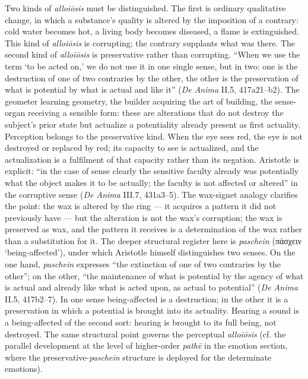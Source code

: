 \documentclass{article}
\newcommand{\gk}[1]{{\greekfont #1}}
\begin{document}
Two kinds of \textit{alloiōsis} must be distinguished. The first is ordinary qualitative change, in which a substance's quality is altered by the imposition of a contrary: cold water becomes hot, a living body becomes diseased, a flame is extinguished. This kind of \textit{alloiōsis} is corrupting; the contrary supplants what was there. The second kind of \textit{alloiōsis} is preservative rather than corrupting. ``When we use the term `to be acted on,' we do not use it in one single sense, but in two: one is the destruction of one of two contraries by the other, the other is the preservation of what is potential by what is actual and like it'' (\textit{De Anima} II.5, 417a21--b2). The geometer learning geometry, the builder acquiring the art of building, the sense-organ receiving a sensible form: these are alterations that do not destroy the subject's prior state but actualize a potentiality already present as first actuality. Perception belongs to the preservative kind. When the eye sees red, the eye is not destroyed or replaced by red; its capacity to see is actualized, and the actualization is a fulfilment of that capacity rather than its negation. Aristotle is explicit: ``in the case of sense clearly the sensitive faculty already was potentially what the object makes it to be actually; the faculty is not affected or altered'' in the corruptive sense (\textit{De Anima} III.7, 431a3--5). The wax-signet analogy clarifies the point: the wax is altered by the ring --- it acquires a pattern it did not previously have --- but the alteration is not the wax's corruption; the wax is preserved as wax, and the pattern it receives is a determination of the wax rather than a substitution for it. The deeper structural register here is \textit{paschein} (\gk{πάσχειν} `being-affected'), under which Aristotle himself distinguishes two senses. On the one hand, \textit{paschein} expresses ``the extinction of one of two contraries by the other''; on the other, ``the maintenance of what is potential by the agency of what is actual and already like what is acted upon, as actual to potential'' (\textit{De Anima} II.5, 417b2--7). In one sense being-affected is a destruction; in the other it is a preservation in which a potential is brought into its actuality. Hearing a sound is a being-affected of the second sort: hearing is brought to its full being, not destroyed. The same structural point governs the perceptual \textit{alloiōsis} (cf. the parallel development at the level of higher-order \textit{pathē} in the emotion section, where the preservative-\textit{paschein} structure is deployed for the determinate emotions).
\end{document}
